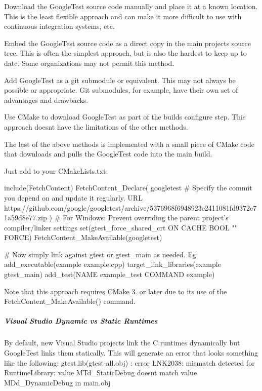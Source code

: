 \begin{DoxyItemize}
\item Download the Google\+Test source code manually and place it at a known location. This is the least flexible approach and can make it more difficult to use with continuous integration systems, etc.
\item Embed the Google\+Test source code as a direct copy in the main project\textquotesingle{}s source tree. This is often the simplest approach, but is also the hardest to keep up to date. Some organizations may not permit this method.
\item Add Google\+Test as a git submodule or equivalent. This may not always be possible or appropriate. Git submodules, for example, have their own set of advantages and drawbacks.
\item Use C\+Make to download Google\+Test as part of the build\textquotesingle{}s configure step. This approach doesn\textquotesingle{}t have the limitations of the other methods.
\end{DoxyItemize}

The last of the above methods is implemented with a small piece of C\+Make code that downloads and pulls the Google\+Test code into the main build.

Just add to your {\ttfamily C\+Make\+Lists.\+txt}\+:


\begin{DoxyCode}
include(FetchContent)
FetchContent\_Declare(
  googletest
  # Specify the commit you depend on and update it regularly.
  URL https://github.com/google/googletest/archive/5376968f6948923e2411081fd9372e71a59d8e77.zip
)
# For Windows: Prevent overriding the parent project's compiler/linker settings
set(gtest\_force\_shared\_crt ON CACHE BOOL "" FORCE)
FetchContent\_MakeAvailable(googletest)

# Now simply link against gtest or gtest\_main as needed. Eg
add\_executable(example example.cpp)
target\_link\_libraries(example gtest\_main)
add\_test(NAME example\_test COMMAND example)
\end{DoxyCode}


Note that this approach requires C\+Make 3. or later due to its use of the {\ttfamily Fetch\+Content\+\_\+\+Make\+Available()} command.

\subparagraph*{Visual Studio Dynamic vs Static Runtimes}

By default, new Visual Studio projects link the C runtimes dynamically but Google\+Test links them statically. This will generate an error that looks something like the following\+: gtest.\+lib(gtest-\/all.\+obj) \+: error L\+N\+K2038\+: mismatch detected for \textquotesingle{}Runtime\+Library\textquotesingle{}\+: value \textquotesingle{}M\+Td\+\_\+\+Static\+Debug\textquotesingle{} doesn\textquotesingle{}t match value \textquotesingle{}M\+Dd\+\_\+\+Dynamic\+Debug\textquotesingle{} in main.\+obj

